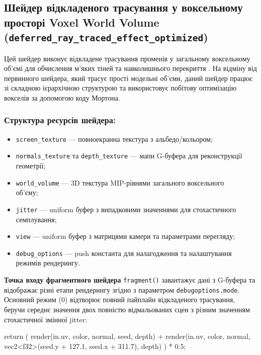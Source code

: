 \subsection{Шейдер відкладеного трасування у воксельному просторі Voxel World Volume\\(\texttt{deferred\_ray\_traced\_effect\_optimized})}

Цей шейдер виконує відкладене трасування променів у загальному воксельному об'ємі для обчислення м'яких тіней та навколишнього перекриття . На відміну від первинного шейдера, який трасує прості модельні об'єми, даний шейдер працює зі складною ієрархічною структурою та використовує побітову оптимізацію вокселів за допомогою коду Мортона.

\subsubsection{Структура ресурсів шейдера:}

\begin{itemize}[itemsep=0pt, topsep=0pt, label=$\diamond$]
    \item \texttt{screen\_texture} --- повноекранна текстура з альбедо/кольором;
    \item \texttt{normals\_texture} та \texttt{depth\_texture} --- мапи G-буфера для реконструкції геометрії;
    \item \texttt{world\_volume} --- 3D текстура MIP-рівнями загального воксельного\\об'єму;
    \item \texttt{jitter} --- uniform буфер з випадковими значеннями для стохастичного семплування;
    \item \texttt{view} --- uniform буфер з матрицями камери та параметрами перегляду;
    \item \texttt{debug\_options} --- push константа для налагодження та налаштування режимів рендерингу.
\end{itemize}

\textbf{Точка входу фрагментного шейдера} \texttt{fragment()} завантажує дані з G-буфера та відображає різні етапи рендерингу згідно з параметром \texttt{debug\-options.mode}. Основний режим (0) відтворює повний пайплайн відкладеного трасування, беручи середнє значення двох повністю відмальованих сцен з різним значенням стохастичної змінної jitter:

\begin{rustcode}
return (
    render(in.uv, color, normal, seed, depth) +
    render(in.uv, color, normal, 
           vec2<f32>(seed.y + 127.1, seed.x + 311.7), depth)
) * 0.5;
\end{rustcode}

